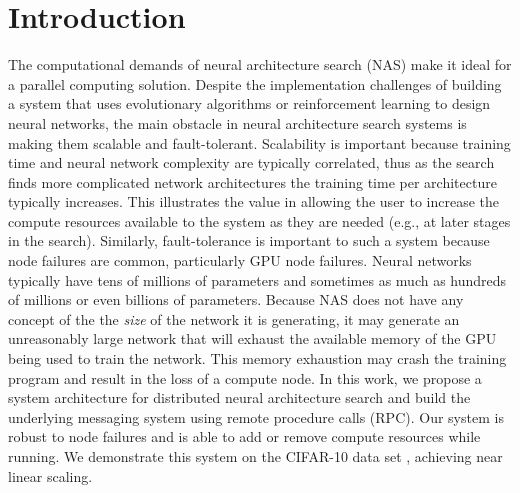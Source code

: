 \documentclass[conference]{IEEEtran}
\begin{document}
\section{Introduction}
The computational demands of neural architecture search (NAS) make it ideal
for a parallel computing solution. Despite the implementation challenges of building
a system that uses evolutionary algorithms or reinforcement learning to design
neural networks, the main obstacle in neural architecture search systems is
making them scalable and fault-tolerant. Scalability is important because
training time and neural network complexity are typically correlated, thus as the search
finds more complicated network architectures the training time per architecture
typically increases. This illustrates the value in allowing the user to increase the compute
resources available to the system as they are needed (e.g., at later stages in the
search). Similarly, fault-tolerance is important to such a system because node
failures are common, particularly GPU node failures.  Neural networks typically
have tens of millions of parameters and sometimes as much as hundreds of millions
or even billions of parameters. Because NAS
does not have any concept of the the \emph{size} of the network it is
generating, it may generate an unreasonably large network that will exhaust the
available memory of the GPU being used to train the network. This memory
exhaustion may crash the training program and result in the loss of a compute node.
In this work, we propose a system
architecture for distributed neural architecture search and build the underlying
messaging system using remote procedure calls (RPC). Our system is
robust to node failures and is able to add or remove compute resources while
running. We demonstrate this system on the CIFAR-10 data set \cite{cifar10-data},
achieving near linear scaling.
\end{document}
